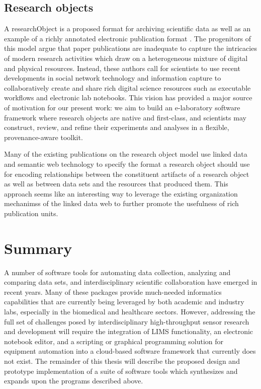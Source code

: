 \documentclass[../thesis]{subfiles}
\begin{document}
\subsection{Research objects}
A \gls{researchObject} is a proposed format for archiving scientific
data as well as an example of a richly annotated electronic
publication format \cite{bechhofer2010research}. The progenitors of
this model argue that paper publications are inadequate to capture the
intricacies of modern research activities which draw on a
heterogeneous mixture of digital and physical resources. Instead,
these authors call for scientists to use recent developments in social
network technology and information capture to collaboratively create
and share rich digital science resources such as executable workflows
and electronic lab notebooks. This vision has provided a major source
of motivation for our present work: we aim to build an e-laboratory
software framework where research objects are native and first-class,
and scientists may construct, review, and refine their experiments and
analyses in a flexible, provenance-aware toolkit.

Many of the existing publications on the research object model
\cite{corcho2012workflow, belhajjame2015using} use
linked data and semantic web technology to specify the format a
research object should use for encoding relationships
between the constituent artifacts of a research object as well as
between data sets and the resources that produced them. This approach
seems like an interesting way to leverage the existing organization
mechanimss of the linked data web to further promote the usefulness of
rich publication units.



\section{Summary}
A number of software tools for automating data collection, analyzing
and comparing data sets, and interdisciplinary scientific
collaboration have emerged in recent years. Many of these packages
provide much-needed informatics capabilities that are currently being
leveraged by both academic and industry labs, especially in the
biomedical and healthcare sectors. However, addressing the full set of
challenges posed by interdisciplinary high-throughput sensor research
and development will require the integration of \gls{LIMS}
functionality, an electronic notebook editor, and a scripting or
graphical programming solution for equipment automation into a
cloud-based software framework that currently does not exist. The
remainder of this thesis will describe the proposed design and
prototype implementation of a suite of software tools which
synthesizes and expands upon the programs described above.
\end{document}
